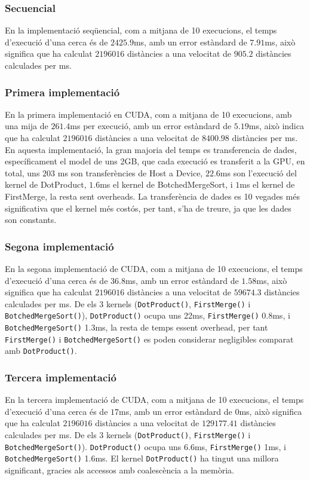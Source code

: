 \documentclass[catalan,10pt,a4paper]{article}
\begin{document}
\subsubsection*{Secuencial}
En la implementació seqüencial, com a mitjana de 10 execucions, el temps d'execució d'una cerca és de $2425.9$ms, amb un error estàndard de $7.91$ms, això significa que ha calculat $2196016$ distàncies a una velocitat de $905.2$ distàncies calculades per ms. 

\subsubsection*{Primera implementació}
En la primera implementació en CUDA, com a mitjana de 10 execucions, amb una mija de $261.4$ms per execució, amb un error estàndard de $5.19$ms, això indica que ha calculat $2196016$ distàncies a una velocitat de $8400.98$ distàncies per ms. En aquesta implementació, la gran majoria del temps es transferencia de dades, específicament el model de uns 2GB, que cada execució es transferit a la GPU, en total, uns $203$ ms son transferències de Host a Device, $22.6$ms son l'execució del kernel de DotProduct, $1.6$ms el kernel de BotchedMergeSort, i $1$ms el kernel de FirstMerge, la resta sent overheads. La transferència de dades es 10 vegades més significativa que el kernel més costós, per tant, s'ha de treure, ja que les dades son constants.

\subsubsection*{Segona implementació}
En la segona implementació de CUDA, com a mitjana de 10 execucions, el temps d'execució d'una cerca és de $36.8$ms, amb un error estàndard de $1.58$ms, això significa que ha calculat $2196016$ distàncies a una velocitat de $59674.3$ distàncies calculades per ms. De els 3 kernels (\verb|DotProduct()|, \verb|FirstMerge()| i \verb|BotchedMergeSort()|), \verb|DotProduct()| ocupa uns 22ms, \verb|FirstMerge()| 0.8ms, i \verb|BotchedMergeSort()| 1.3ms, la resta de temps essent overhead, per tant \verb|FirstMerge()| i \verb|BotchedMergeSort()| es poden considerar negligibles comparat amb \verb|DotProduct()|.

\subsubsection*{Tercera implementació}
En la tercera implementació de CUDA, com a mitjana de 10 execucions, el temps d'execució d'una cerca és de $17$ms, amb un error estàndard de $0$ms, això significa que ha calculat $2196016$ distàncies a una velocitat de $129177.41$ distàncies calculades per ms. De els 3 kernels (\verb|DotProduct()|, \verb|FirstMerge()| i \verb|BotchedMergeSort()|). \verb|DotProduct()| ocupa uns 6.6ms, \verb|FirstMerge()| 1ms, i \verb|BotchedMergeSort()| 1.6ms. El kernel \verb|DotProduct()| ha tingut una millora significant, gracies als accessos amb coalescència a la memòria.
\end{document}
